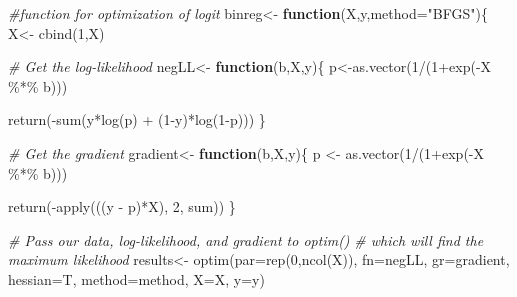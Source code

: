\documentclass[
]{article}
\newenvironment{Shaded}{\begin{snugshade}}{\end{snugshade}}
\newcommand{\AttributeTok}[1]{\textcolor[rgb]{0.77,0.63,0.00}{#1}}
\newcommand{\CommentTok}[1]{\textcolor[rgb]{0.56,0.35,0.01}{\textit{#1}}}
\newcommand{\ControlFlowTok}[1]{\textcolor[rgb]{0.13,0.29,0.53}{\textbf{#1}}}
\newcommand{\DecValTok}[1]{\textcolor[rgb]{0.00,0.00,0.81}{#1}}
\newcommand{\FunctionTok}[1]{\textcolor[rgb]{0.00,0.00,0.00}{#1}}
\newcommand{\NormalTok}[1]{#1}
\newcommand{\OtherTok}[1]{\textcolor[rgb]{0.56,0.35,0.01}{#1}}
\newcommand{\SpecialCharTok}[1]{\textcolor[rgb]{0.00,0.00,0.00}{#1}}
\newcommand{\StringTok}[1]{\textcolor[rgb]{0.31,0.60,0.02}{#1}}
\begin{document}
\begin{Shaded}
\begin{Highlighting}[]
\CommentTok{\#function for optimization of logit}
\NormalTok{binreg}\OtherTok{\textless{}{-}} \ControlFlowTok{function}\NormalTok{(X,y,}\AttributeTok{method=}\StringTok{"BFGS"}\NormalTok{)\{}
\NormalTok{  X}\OtherTok{\textless{}{-}} \FunctionTok{cbind}\NormalTok{(}\DecValTok{1}\NormalTok{,X)}
  
  \CommentTok{\# Get the log{-}likelihood}
\NormalTok{  negLL}\OtherTok{\textless{}{-}} \ControlFlowTok{function}\NormalTok{(b,X,y)\{}
\NormalTok{    p}\OtherTok{\textless{}{-}}\FunctionTok{as.vector}\NormalTok{(}\DecValTok{1}\SpecialCharTok{/}\NormalTok{(}\DecValTok{1}\SpecialCharTok{+}\FunctionTok{exp}\NormalTok{(}\SpecialCharTok{{-}}\NormalTok{X }\SpecialCharTok{\%*\%}\NormalTok{ b)))}
    
    \FunctionTok{return}\NormalTok{(}\SpecialCharTok{{-}}\FunctionTok{sum}\NormalTok{(y}\SpecialCharTok{*}\FunctionTok{log}\NormalTok{(p) }\SpecialCharTok{+}\NormalTok{ (}\DecValTok{1}\SpecialCharTok{{-}}\NormalTok{y)}\SpecialCharTok{*}\FunctionTok{log}\NormalTok{(}\DecValTok{1}\SpecialCharTok{{-}}\NormalTok{p)))}
\NormalTok{  \}}
  
  \CommentTok{\# Get the gradient}
\NormalTok{  gradient}\OtherTok{\textless{}{-}} \ControlFlowTok{function}\NormalTok{(b,X,y)\{}
\NormalTok{    p }\OtherTok{\textless{}{-}} \FunctionTok{as.vector}\NormalTok{(}\DecValTok{1}\SpecialCharTok{/}\NormalTok{(}\DecValTok{1}\SpecialCharTok{+}\FunctionTok{exp}\NormalTok{(}\SpecialCharTok{{-}}\NormalTok{X }\SpecialCharTok{\%*\%}\NormalTok{ b)))}
    
    \FunctionTok{return}\NormalTok{(}\SpecialCharTok{{-}}\FunctionTok{apply}\NormalTok{(((y }\SpecialCharTok{{-}}\NormalTok{ p)}\SpecialCharTok{*}\NormalTok{X), }\DecValTok{2}\NormalTok{, sum))}
\NormalTok{  \}}
  
  \CommentTok{\# Pass our data, log{-}likelihood, and gradient to optim() }
  \CommentTok{\# which will find the maximum likelihood}
\NormalTok{  results}\OtherTok{\textless{}{-}} \FunctionTok{optim}\NormalTok{(}\AttributeTok{par=}\FunctionTok{rep}\NormalTok{(}\DecValTok{0}\NormalTok{,}\FunctionTok{ncol}\NormalTok{(X)), }
                  \AttributeTok{fn=}\NormalTok{negLL,}
                  \AttributeTok{gr=}\NormalTok{gradient, }
                  \AttributeTok{hessian=}\NormalTok{T, }
                  \AttributeTok{method=}\NormalTok{method,}
                  \AttributeTok{X=}\NormalTok{X,}
                  \AttributeTok{y=}\NormalTok{y)}
  

\end{Highlighting}
\end{Shaded}
\end{document}
